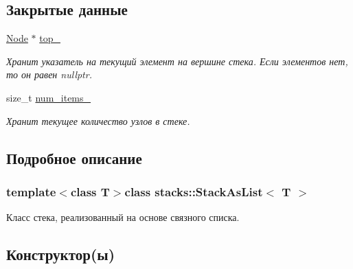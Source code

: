 \subsection*{Закрытые данные}
\begin{DoxyCompactItemize}
\item 
\hyperlink{structstacks_1_1_stack_as_list_1_1_node}{Node} $\ast$ \hyperlink{classstacks_1_1_stack_as_list_a0e0590bb339a3fb55b8f1cdac941769a}{top\+\_\+}
\begin{DoxyCompactList}\small\item\em Хранит указатель на текущий элемент на вершине стека. Если элементов нет, то он равен nullptr. \end{DoxyCompactList}\item 
size\+\_\+t \hyperlink{classstacks_1_1_stack_as_list_a09f45c7af846b515531bd9368b772f27}{num\+\_\+items\+\_\+}
\begin{DoxyCompactList}\small\item\em Хранит текущее количество узлов в стеке. \end{DoxyCompactList}\end{DoxyCompactItemize}


\subsection{Подробное описание}
\subsubsection*{template$<$class T$>$class stacks\+::\+Stack\+As\+List$<$ T $>$}

Класс стека, реализованный на основе связного списка. 

\subsection{Конструктор(ы)}
\hypertarget{classstacks_1_1_stack_as_list_afeaf9531232f88bbfaea6fa27bfbfadb}{}
